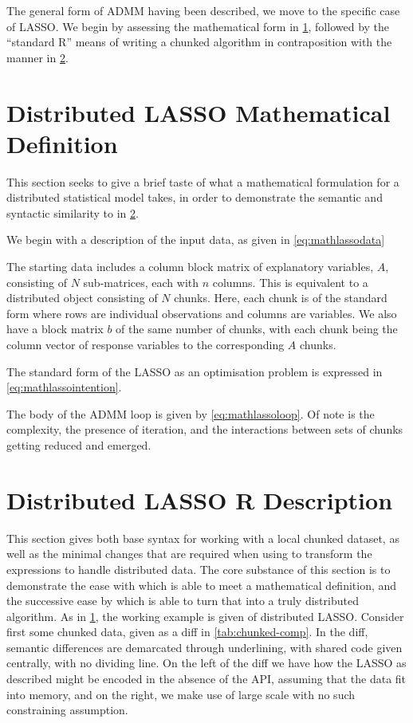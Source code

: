 The general form of ADMM having been described, we move to the specific case of LASSO.
We begin by assessing the mathematical form in \cref{sec:mathlasso}, followed by the ``standard R'' means of writing a chunked algorithm in contraposition with the \lsr{} manner in \cref{sec:rlasso}.

\section{Distributed LASSO Mathematical Definition}\label{sec:mathlasso}

This section seeks to give a brief taste of what a mathematical formulation for a distributed statistical model takes, in order to demonstrate the semantic and syntactic similarity to \lsr{} in \cref{sec:rlasso}.

We begin with a description of the input data, as given in \cref{eq:mathlassodata}


The starting data includes a column block matrix of explanatory variables, $A$, consisting of $N$ sub-matrices, each with $n$ columns.
This is equivalent to a distributed object consisting of $N$ chunks.
Here, each chunk is of the standard form where rows are individual observations and columns are variables.
We also have a block matrix $b$ of the same number of chunks, with each chunk being the column vector of response variables to the corresponding $A$ chunks.

The standard form of the LASSO as an optimisation problem is expressed in \cref{eq:mathlassointention}.


The body of the ADMM loop is given by \cref{eq:mathlassoloop}.
Of note is the complexity, the presence of iteration, and the interactions between sets of chunks getting reduced and emerged.


\section{Distributed LASSO R Description}\label{sec:rlasso}

This section gives both base \R{} syntax for working with a local chunked dataset, as well as the minimal changes that are required when using \lsr{} to transform the expressions to handle distributed data.
The core substance of this section is to demonstrate the ease with which \R{} is able to meet a mathematical definition, and the successive ease by which \lsr{} is able to turn that into a truly distributed algorithm.
As in \cref{sec:mathlasso}, the working example is given of distributed LASSO.
Consider first some chunked data, given as a diff in \cref{tab:chunked-comp}.
In the diff, semantic differences are demarcated through underlining, with shared code given centrally, with no dividing line.
On the left of the diff we have how the LASSO as described might be encoded in the absence of the API, assuming that the data fit into memory, and on the right, we make use of large scale \R{} with no such constraining assumption.

